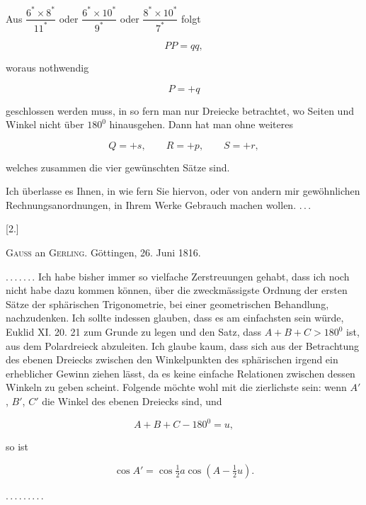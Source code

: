 Aus $\dfrac{6^\ast\times 8^\ast}{11^\ast}$ oder $\dfrac{6^\ast\times 10^\ast}{9^\ast}$ oder $\dfrac{8^\ast\times 10^\ast}{7^\ast}$ folgt

\[
PP=qq,
\]

woraus nothwendig

\[
P=+q
\]

geschlossen werden muss, in so fern man nur Dreiecke betrachtet, wo Seiten und Winkel nicht über $180^0$ hinausgehen. Dann hat man ohne weiteres

\[
Q=+s,\qquad R=+p,\qquad S=+r,
\]

welches zusammen die vier gewünschten Sätze sind.

Ich überlasse es Ihnen, in wie fern Sie hiervon, oder von andern mir gewöhnlichen Rechnungsanordnungen, in Ihrem Werke Gebrauch machen wollen. \mbox{.\,.\,.}

\medskip

\begin{center}
[2.]

\textsc{Gauss} an \textsc{Gerling}. Göttingen, 26. Juni 1816.
\end{center}

\mbox{.\,.\,.\,.\,.\,.\,.} Ich habe bisher immer so vielfache Zerstreuungen gehabt, dass ich noch nicht habe dazu kommen können, über die zweckmässigste Ordnung der ersten Sätze der sphärischen Trigonometrie, bei einer geometrischen Behandlung, nachzudenken. Ich sollte indessen glauben, dass es am einfachsten sein würde, Euklid XI. 20. 21 zum Grunde zu legen und den Satz, dass $A+B+C>180^0$ ist, aus dem Polardreieck abzuleiten. Ich glaube kaum, dass sich aus der Betrachtung des ebenen Dreiecks zwischen den Winkelpunkten des sphärischen irgend ein erheblicher Gewinn ziehen lässt, da es keine  einfache Relationen zwischen dessen Winkeln zu geben scheint. Folgende möchte wohl mit die zierlichste sein: wenn $A'$, $B'$, $C'$ die Winkel des ebenen Dreiecks sind, und

\[
A+B+C-180^0=u,
\]

so ist

\[
\cos A'=\cos\tfrac{1}{2}a\cos(A-\tfrac{1}{2}u).
\]

\mbox{.\,.\,.\,.\,.\,.\,.\,.\,.}

